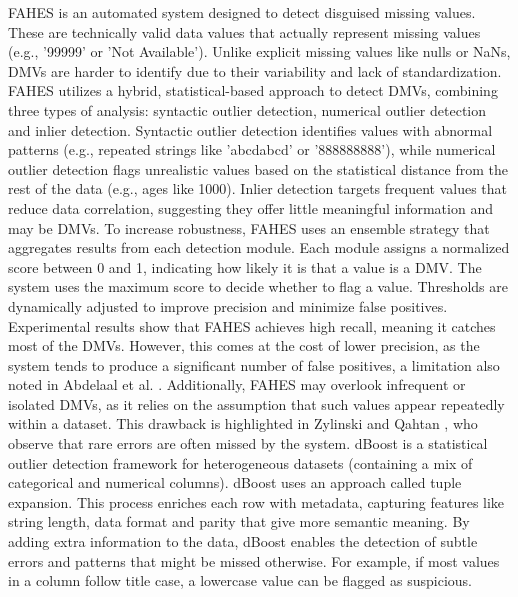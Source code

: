 \newline\newline
FAHES \cite{FAHES} is an automated system designed to detect disguised missing values. 
These are technically valid data values that actually represent missing values (e.g., '99999' or 'Not Available'). 
Unlike explicit missing values like nulls or NaNs, DMVs are harder to identify due to their variability and lack of standardization. 
FAHES utilizes a hybrid, statistical-based approach to detect DMVs, combining three types of analysis: syntactic outlier detection, numerical outlier detection and inlier detection. 
Syntactic outlier detection identifies values with abnormal patterns (e.g., repeated strings like 'abcdabcd' or '888888888'), while numerical outlier detection flags unrealistic values based on the statistical distance from the rest of the data (e.g., ages like 1000). 
Inlier detection targets frequent values that reduce data correlation, suggesting they offer little meaningful information and may be DMVs. 
To increase robustness, FAHES uses an ensemble strategy that aggregates results from each detection module. 
Each module assigns a normalized score between 0 and 1, indicating how likely it is that a value is a DMV. 
The system uses the maximum score to decide whether to flag a value. 
Thresholds are dynamically adjusted to improve precision and minimize false positives. 
Experimental results show that FAHES achieves high recall, meaning it catches most of the DMVs. 
However, this comes at the cost of lower precision, as the system tends to produce a significant number of false positives, a limitation also noted in Abdelaal et al. \cite{REIN}. 
Additionally, FAHES may overlook infrequent or isolated DMVs, as it relies on the assumption that such values appear repeatedly within a dataset. 
This drawback is highlighted in Zylinski and Qahtan \cite{SYNODC}, who observe that rare errors are often missed by the system.
\newline\newline
dBoost \cite{DBOOST} is a statistical outlier detection framework for heterogeneous datasets (containing a mix of categorical and numerical columns). 
dBoost uses an approach called tuple expansion. 
This process enriches each row with metadata, capturing features like string length, data format and parity that give more semantic meaning. 
By adding extra information to the data, dBoost enables the detection of subtle errors and patterns that might be missed otherwise. 
For example, if most values in a column follow title case, a lowercase value can be flagged as suspicious. 
